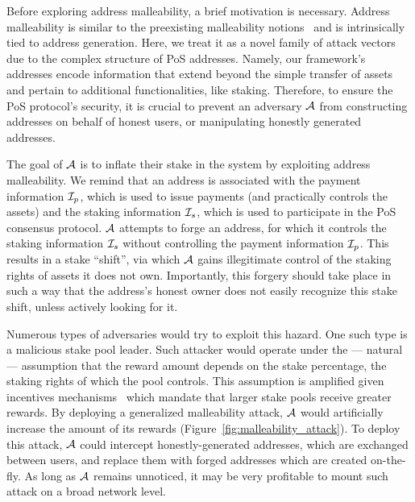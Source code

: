 Before exploring address malleability, a brief motivation is necessary. Address
malleability is similar to the preexisting malleability
notions~\cite{dolev2003nonmalleable} and is intrinsically tied to address
generation. Here, we treat it as a novel family of attack vectors due to the
complex structure of PoS addresses. Namely, our framework's addresses encode
information that extend beyond the simple transfer of assets and pertain to
additional functionalities, like staking. Therefore, to ensure the PoS
protocol's security, it is crucial to prevent an adversary $\mathcal{A}$ from
constructing addresses on behalf of honest users, or manipulating honestly
generated addresses.

The goal of $\mathcal{A}$ is to inflate their stake in the system by exploiting
address malleability. We remind that an address is associated with the payment
information $\mathcal{I}_p$, which is used to issue payments (and practically
controls the assets) and the staking information $\mathcal{I}_s$, which is used to
participate in the PoS consensus protocol. $\mathcal{A}$ attempts to forge an
address, for which it controls the staking information $\mathcal{I}_s$ without
controlling the payment information $\mathcal{I}_p$. This results in a stake
``shift'', via which $\mathcal{A}$ gains illegitimate control of the staking
rights of assets it does not own.  Importantly, this forgery should take place
in such a way that the address's honest owner does not easily recognize this
stake shift, unless actively looking for it.

Numerous types of adversaries would try to exploit this hazard.  One such type
is a malicious stake pool leader. Such attacker would operate under the ---
natural --- assumption that the reward amount depends on the stake percentage,
the staking rights of which the pool controls. This assumption is amplified
given incentives mechanisms~\cite{DBLP:journals/corr/abs-1807-11218} which
mandate that larger stake pools receive greater rewards. By deploying a
generalized malleability attack, $\mathcal{A}$ would artificially increase the
amount of its rewards (Figure~\ref{fig:malleability_attack}). To deploy this
attack, $\mathcal{A}$ could intercept honestly-generated addresses, which are
exchanged between users, and replace them with forged addresses which are
created on-the-fly. As long as $\mathcal{A}$ remains unnoticed, it may be very
profitable to mount such attack on a broad network level.

